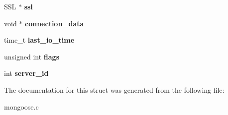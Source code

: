 \begin{DoxyCompactItemize}
\item 
\hypertarget{structns__connection_a05f3d0c665984d93dd4e8ef7e0c88c88}{S\-S\-L $\ast$ {\bfseries ssl}}\label{structns__connection_a05f3d0c665984d93dd4e8ef7e0c88c88}

\item 
\hypertarget{structns__connection_ace2bc6e8bbec85302ee8ab9351fe8932}{void $\ast$ {\bfseries connection\-\_\-data}}\label{structns__connection_ace2bc6e8bbec85302ee8ab9351fe8932}

\item 
\hypertarget{structns__connection_ac9c1c38e7d8a3b1a21d361ee61683b20}{time\-\_\-t {\bfseries last\-\_\-io\-\_\-time}}\label{structns__connection_ac9c1c38e7d8a3b1a21d361ee61683b20}

\item 
\hypertarget{structns__connection_ac096ae7a3121c09aa68b36dcef2e4116}{unsigned int {\bfseries flags}}\label{structns__connection_ac096ae7a3121c09aa68b36dcef2e4116}

\item 
\hypertarget{structns__connection_a11e883fe2fdaed8f33834e436a877b8e}{int {\bfseries server\-\_\-id}}\label{structns__connection_a11e883fe2fdaed8f33834e436a877b8e}

\end{DoxyCompactItemize}


The documentation for this struct was generated from the following file\-:\begin{DoxyCompactItemize}
\item 
mongoose.\-c\end{DoxyCompactItemize}

